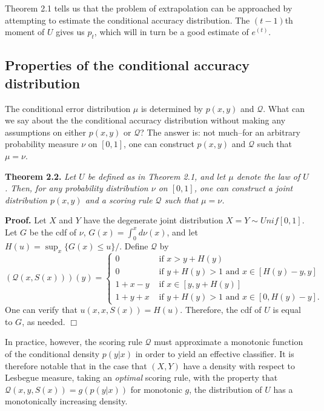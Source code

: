 \documentclass{article}
\begin{document}
Theorem 2.1 tells us that the problem of extrapolation can be
approached by attempting to estimate the conditional accuracy
distribution.  The $(t-1)$th moment of $U$ gives us $p_t$, which will
in turn be a good estimate of $e^{(t)}$.

\subsection{Properties of the conditional accuracy distribution}

The conditional error distribution $\mu$ is determined by $p(x, y)$
and $\mathcal{Q}$.  What can we say about the the conditional accuracy
distribution without making any assumptions on either $p(x, y)$ or
$\mathcal{Q}$?  The answer is: not much--for an arbitrary probability
measure $\nu$ on $[0,1]$, one can construct $p(x, y)$ and
$\mathcal{Q}$ such that $\mu = \nu$.

\noindent\textbf{Theorem 2.2.} \emph{ Let $U$ be defined as in Theorem
  2.1, and let $\mu$ denote the law of $U$.  Then, for any probability
  distribution $\nu$ on $[0,1]$, one can construct a joint
  distribution $p(x, y)$ and a scoring rule $\mathcal{Q}$ such that 
  $\mu = \nu$.
}

\noindent\textbf{Proof.}  
Let $X$ and $Y$ have the degenerate joint distribution $X= Y \sim Unif[0, 1]$.
Let $G$ be the cdf of $\nu$, $G(x) = \int_0^x d\nu(x)$, and let $H(u) = \sup_x \{G(x) \leq u\}/$.
Define $\mathcal{Q}$ by
\[
\left(\mathcal{Q}(x, S(x))\right)(y) = \begin{cases}
0 &\text{ if }x > y + H(y)\\
0 & \text{ if }y + H(y) > 1 \text{ and }x \in [H(y) - y, y]\\
1 + x - y &\text{ if } x \in [y, y + H(y)]\\
1 + y + x &\text{ if }y + H(y) > 1 \text{ and }x \in [0, H(y) - y]. 
\end{cases}
\]
One can verify that $u(x, x, S(x)) = H(u).$  Therefore, the cdf of $U$ is equal to $G$, as needed. $\Box$

In practice, however, the scoring rule $\mathcal{Q}$ must approximate a monotonic function of the conditional density $p(y|x)$
in order to yield an effective classifier.  It is therefore notable that in the case that $(X, Y)$ have a density with respect to Lesbegue measure,
taking an \emph{optimal} scoring rule,
with the property that $\mathcal{Q}(x, y, S(x)) = g(p(y|x))$ for monotonic $g$,
the distribution of $U$ has a monotonically increasing density.
\end{document}
